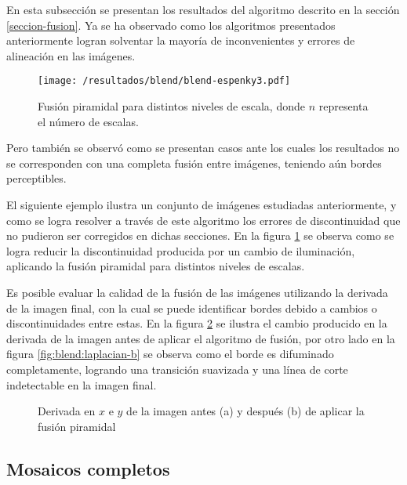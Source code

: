 En esta subsección se presentan los resultados del algoritmo descrito en la sección \ref{seccion-fusion}. Ya se ha observado como los algoritmos presentados anteriormente logran solventar la mayoría de inconvenientes y errores de alineación en las imágenes. \begin{figure}[H]
	\centering
	\texttt{[image: /resultados/blend/blend-espenky3.pdf]}
	\caption[Resultado de fusión pirámidal: \textit{Espenky}]{Fusión piramidal para distintos niveles de escala, donde $n$ representa el número de escalas.}
	\label{imagen:blend:espenky}
\end{figure}
Pero también se observó como se presentan casos ante los cuales los resultados no se corresponden con una completa fusión entre imágenes, teniendo aún bordes perceptibles.



El siguiente ejemplo ilustra un conjunto de imágenes estudiadas anteriormente, y como se logra resolver a través de este algoritmo los errores de discontinuidad que no pudieron ser corregidos en dichas secciones. En la figura \ref{imagen:blend:espenky} se observa como se logra reducir la discontinuidad producida por un cambio de iluminación, aplicando la fusión piramidal para distintos niveles de escalas.



Es posible evaluar la calidad de la fusión de las imágenes utilizando la derivada de la imagen final, con la cual se puede identificar bordes debido a cambios o discontinuidades entre estas. En la figura \ref{imagen:blend:laplacian} se ilustra el cambio producido en la derivada de la imagen antes de aplicar el algoritmo de fusión, por otro lado en la figura \ref{fig:blend:laplacian-b} se observa como el borde es difuminado completamente, logrando una transición suavizada y una línea de corte indetectable en la imagen final. 

\begin{figure}[H]
	\centering     %
	
	\caption[Resultado de fusión pirámidal: \textit{Espenky}]{Derivada en $x$ e $y$ de la imagen antes (a) y después (b) de aplicar la fusión piramidal}
	\label{imagen:blend:laplacian}
\end{figure}

\subsection*{Mosaicos completos}

